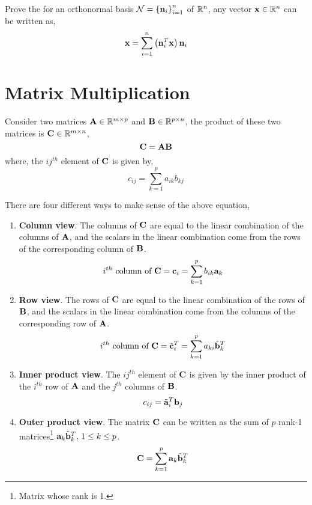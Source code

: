 \begin{problem*}
Prove the for an orthonormal basis $\mathcal{N} = \left\{ \mathbf{n}_i \right\}_{i=1}^n$ of $\mathbb{R}^n$, any vector $\mathbf{x} \in \mathbb{R}^n$ can be written as,
\[ \mathbf{x} = \sum_{i=1}^n \left( \mathbf{n}_i^T\mathbf{x} \right)\mathbf{n}_i\]
\end{problem*}

\section{Matrix Multiplication}
Consider two matrices $\mathbf{A} \in \mathbb{R}^{m \times p}$ and $\mathbf{B} \in \mathbb{R}^{p \times n}$, the product of these two matrices is $\mathbf{C} \in \mathbb{R}^{m \times n}$,
\[ \mathbf{C} = \mathbf{A}\mathbf{B} \]
where, the $ij^{th}$ element of $\mathbf{C}$ is given by,
\[ c_{ij} = \sum_{k=1}^p a_{ik}b_{kj} \]

There are four different ways to make sense of the above equation,
\begin{enumerate}
    \item \textbf{Column view}. The columns of $\mathbf{C}$ are equal to the linear combination of the columns of $\mathbf{A}$, and the scalars in the linear combination come from the rows of the corresponding column of $\mathbf{B}$.
    \[ i^{th} \text{ column of } \mathbf{C} = \mathbf{c}_i = \sum_{k=1}^p b_{ik}\mathbf{a}_k \]

    \item \textbf{Row view}. The rows of $\mathbf{C}$ are equal to the linear combination of the rows of $\mathbf{B}$, and the scalars in the linear combination come from the columns of the corresponding row of $\mathbf{A}$.
    \[ i^{th} \text{ column of } \mathbf{C} = \tilde{\mathbf{c}}_i^T = \sum_{k=1}^p a_{ki}\tilde{\mathbf{b}}_k^T \]

    \item \textbf{Inner product view}. The $ij^{th}$ element of $\mathbf{C}$ is given by the inner product of the $i^{th}$ row of $\mathbf{A}$ and the $j^{th}$ columns of $\mathbf{B}$.
    \[  c_{ij} = \tilde{\mathbf{a}}_i^T\mathbf{b}_j \]

    \item \textbf{Outer product view}. The matrix $\mathbf{C}$ can be written as the sum of $p$ rank-1 matrices\footnote{Matrix whose rank is 1.} $\mathbf{a}_k\tilde{\mathbf{b}}_k^T, \, 1 \leq k \leq p$.
    \[ \mathbf{C} = \sum_{k=1}^p \mathbf{a}_k\tilde{\mathbf{b}}_k^T \]
\end{enumerate}

